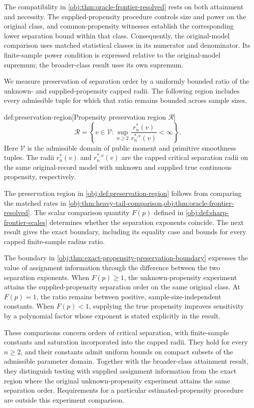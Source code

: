 The compatibility in \cref{obj:thm:oracle-frontier-resolved} rests on both attainment and necessity. The supplied-propensity procedure controls size and power on the original class, and common-propensity witnesses establish the corresponding lower separation bound within that class. Consequently, the original-model comparison uses matched statistical classes in its numerator and denominator. Its finite-sample power condition is expressed relative to the original-model supremum; the broader-class result uses its own supremum.

We measure preservation of separation order by a uniformly bounded ratio of the unknown- and supplied-propensity capped radii. The following region includes every admissible tuple for which that ratio remains bounded across sample sizes.

\begin{definitionv}{def:preservation-region}[Propensity preservation region $\mathcal R$]
\[
\mathcal R=
\left\{
v\in\mathcal V:
\sup_{n\ge 2}
\frac{r_n^*(v)}{r_n^{*,\mathrm e}(v)}
<\infty
\right\}.
\]
Here \(\mathcal V\) is the admissible domain of public moment and primitive smoothness tuples. The radii \(r_n^*(v)\) and \(r_n^{*,\mathrm e}(v)\) are the capped critical separation radii on the same original-record model with unknown and supplied true continuous propensity, respectively.
\end{definitionv}

The preservation region  in \cref{obj:def:preservation-region} follows from comparing the matched rates in \cref{obj:thm:heavy-tail-comparison,obj:thm:oracle-frontier-resolved}. The scalar comparison quantity \(F(p)\) defined in \cref{obj:def:sharp-frontier-scales} determines whether the separation exponents coincide. The next result gives the exact boundary, including its equality case and bounds for every capped finite-sample radius ratio.



The boundary in \cref{obj:thm:exact-propensity-preservation-boundary} expresses the value of assignment information through the difference between the two separation exponents. When \(F(p)\ge1\), the unknown-propensity experiment attains the supplied-propensity separation order on the same original class. At \(F(p)=1\), the ratio remains between positive, sample-size-independent constants. When \(F(p)<1\), supplying the true propensity improves sensitivity by a polynomial factor whose exponent is stated explicitly in the result.

These comparisons concern orders of critical separation, with finite-sample constants and saturation incorporated into the capped radii. They hold for every \(n\ge2\), and their constants admit uniform bounds on compact subsets of the admissible parameter domain. Together with the broader-class attainment result, they distinguish testing with supplied assignment information from the exact region where the original unknown-propensity experiment attains the same separation order. Requirements for a particular estimated-propensity procedure are outside this experiment comparison.

